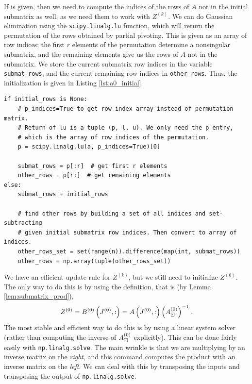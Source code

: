 \documentclass{article}
\begin{document}
	If \vinitialrows{} is given, then we need to compute the indices of the rows of $A$ not in the initial submatrix as well, as we need them to work with $Z^{(k)}$. We can do Gaussian elimination using the \texttt{scipy.linalg.lu} function, which will return the permutation of the rows obtained by partial pivoting. This is given as an array of row indices; the first $r$ elements of the permutation determine a nonsingular submatrix, and the remaining elements give us the rows of $A$ not in the submatrix. We store the current submatrix row indices in the variable \texttt{submat\_rows}, and the current remaining row indices in \texttt{other\_rows}. Thus, the initialization is given in Listing \ref{lst:a0_initial}.
	\begin{lstlisting}[caption={$\matstep{0}$ initialization}, label=lst:a0_initial]
if initial_rows is None:
    # p_indices=True to get row index array instead of permutation matrix.
    # Return of lu is a tuple (p, l, u). We only need the p entry, 
    # which is the array of row indices of the permutation.
    p = scipy.linalg.lu(a, p_indices=True)[0]
    
    submat_rows = p[:r]  # get first r elements
    other_rows = p[r:]  # get remaining elements
else:
    submat_rows = initial_rows
    
    # find other rows by building a set of all indices and set-subtracting
    # given initial submatrix row indices. Then convert to array of indices.
    other_rows_set = set(range(n)).difference(map(int, submat_rows))
    other_rows = np.array(tuple(other_rows_set))
	\end{lstlisting}
	
	
	\newcommand{\vz}{\texttt{z}}
	
	We have an efficient update rule for $Z^{(k)}$, but we still need to initialize $Z^{(0)}$. The only way to do this is by using the definition, that is (by Lemma \ref{lem:submatrix_prod}),
	\begin{equation}
		Z^{(0)} = B^{(0)}\left(J^{(0)}, :\right) = A\left(J^{(0)}, :\right)\left(A_\boxdot^{(0)}\right)^{-1}.
	\end{equation}
	The most stable and efficient way to do this is by using a linear system solver (rather than computing the inverse of $A_\boxdot^{(0)}$ explicitly). This can be done fairly easily with \texttt{np.linalg.solve}. The main wrinkle is that we are multiplying by an inverse matrix on the \textit{right}, and this command computes the product with an inverse matrix on the \textit{left}. We can deal with this by transposing the inputs and transposing the output of \texttt{np.linalg.solve}. 
	
\end{document}
